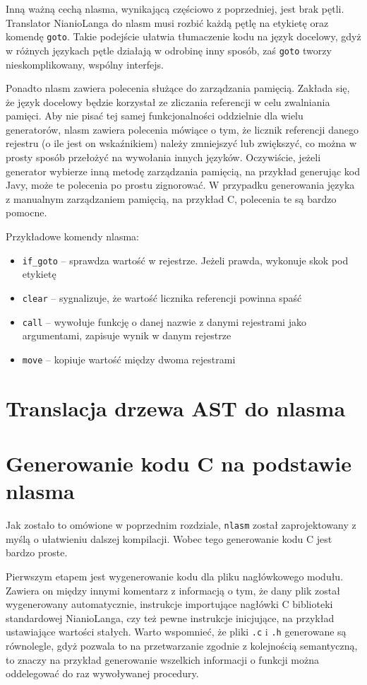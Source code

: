 \documentclass[licencjacka]{pracamgr}
\begin{document}
Inną ważną cechą nlasma, wynikającą częściowo z poprzedniej, jest brak pętli. Translator NianioLanga do nlasm musi rozbić każdą pętlę na etykietę oraz
komendę \texttt{goto}. Takie podejście ułatwia tłumaczenie kodu na język docelowy, gdyż w różnych językach pętle działają w odrobinę inny sposób, zaś
\texttt{goto} tworzy nieskomplikowany, wspólny interfejs.

Ponadto nlasm zawiera polecenia służące do zarządzania pamięcią. Zakłada się, że język docelowy będzie korzystał ze zliczania referencji w celu
zwalniania pamięci. Aby nie pisać tej samej funkcjonalności oddzielnie dla wielu generatorów, nlasm zawiera polecenia mówiące o tym, że licznik
referencji danego rejestru (o ile jest on wskaźnikiem) należy zmniejszyć lub zwiększyć, co można w prosty sposób przełożyć na wywołania innych
języków. Oczywiście, jeżeli generator wybierze inną metodę zarządzania pamięcią, na przykład generując kod Javy, może te polecenia po prostu
zignorować. W przypadku generowania języka z manualnym zarządzaniem pamięcią, na przykład C, polecenia te są bardzo pomocne.


Przykładowe komendy nlasma:
\begin{itemize}
\item \texttt{if\_goto} -- sprawdza wartość w rejestrze. Jeżeli prawda, wykonuje skok pod etykietę
\item \texttt{clear} -- sygnalizuje, że wartość licznika referencji powinna spaść
\item \texttt{call} -- wywołuje funkcję o danej nazwie z danymi rejestrami jako argumentami, zapisuje wynik w danym rejestrze
\item \texttt{move} -- kopiuje wartość między dwoma rejestrami
\end{itemize}
\section{Translacja drzewa AST do nlasma}
\label{sec:translation}
\section{Generowanie kodu C na podstawie nlasma}
Jak zostało to omówione w poprzednim rozdziale, \texttt{nlasm} został zaprojektowany z myślą o ułatwieniu dalszej kompilacji. Wobec tego generowanie
kodu C jest bardzo proste.


Pierwszym etapem jest wygenerowanie kodu dla pliku nagłówkowego modułu. Zawiera on między innymi komentarz z informacją o tym, że dany plik został
wygenerowany automatycznie, instrukcje importujące nagłówki C biblioteki standardowej NianioLanga, czy też pewne instrukcje inicjujące, na przykład
ustawiające wartości stałych. Warto wspomnieć, że pliki \texttt{.c} i \texttt{.h} generowane są równolegle, gdyż pozwala to na przetwarzanie zgodnie z
kolejnością semantyczną, to znaczy na przykład generowanie wszelkich informacji o funkcji można oddelegować do raz wywoływanej procedury.
\end{document}
